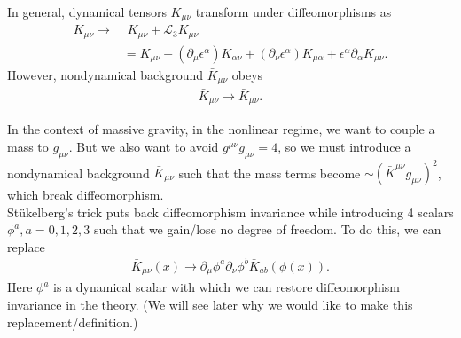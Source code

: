 \documentclass{book}
\theoremstyle{definition}
\newcommand{\p}{\partial}
\newcommand{\lag}{\mathcal{L}}
\newcommand{\nn}{\nonumber}
\begin{document}
In general, dynamical tensors $K_{\mu\nu}$ transform under diffeomorphisms as
\begin{align}
K_{\mu\nu} \to &\,\,K_{\mu\nu} + \lag_3 K_{\mu\nu} \nn\\
&= K_{\mu\nu} + (\p_\mu \epsilon^\alpha)K_{\alpha\nu} + (\p_\nu \epsilon^\alpha)K_{\mu\alpha} + \epsilon^\alpha \p_\alpha K_{\mu\nu}.
\end{align}
However, nondynamical background $\bar{K}_{\mu\nu}$ obeys
\begin{align}
\bar{K}_{\mu\nu} \to \bar{K}_{\mu\nu}.
\end{align}

In the context of massive gravity, in the nonlinear regime, we want to couple a mass to $g_{\mu\nu}$. But we also want to avoid $g^{\mu\nu}g_{\mu\nu} = 4$, so we must introduce a nondynamical background $\bar{K}_{\mu\nu}$ such that the mass terms become $\sim (\bar{K}^{\mu\nu}g_{\mu\nu})^2$, which break diffeomorphism.  \\

St\"{u}kelberg's trick puts back diffeomorphism invariance while introducing 4 scalars $\phi^a, a = 0,1,2,3$ such that we gain/lose no degree of freedom. To do this, we can replace
\begin{align}
\bar{K}_{\mu\nu}(x) \to \p_\mu \phi^a \p_\nu \phi^b \bar{K}_{ab}(\phi(x)).
\end{align}
Here $\phi^a$ is a dynamical scalar with which we can restore diffeomorphism invariance in the theory. (We will see later why we would like to make this replacement/definition.)\\
\end{document}

